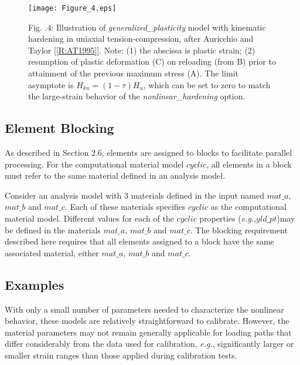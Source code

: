 \documentclass[11pt]{report}
\numberwithin{equation}{section}
\newcommand{\eg}{\emph{e.g.},\xspace}
\begin{document}
\begin{figure}[htb]
\begin{center}
\texttt{[image: Figure\_4.eps]} 

\caption*{\small Fig. \thesection.4: Illustration of \textit{generalized\_plasticity} 
model with kinematic hardening in 
uniaxial tension-compression, after Auricchio and Taylor [\ref{R:AT1995}]. Note: (1) the
abscissa is plastic strain; (2) resumption of plastic deformation (C) on 
reloading (from B) prior to attainment
of the previous maximum stress (A). The limit asymptote is $H_{ku}=(1-\tau)H_u$, which
can be set to zero to match the large-strain behavior of the
\textit{nonlinear\_hardening} option.
\normalsize}

\end{center}
\end{figure}
\subsection {Element Blocking}
As described in Section 2.6, elements are assigned to blocks
to facilitate parallel processing. For the computational material model
$cyclic$,
all elements in a block must refer to the same material defined
in an analysis model.

Consider an analysis model with 3 materials defined in the input
named $mat\_a$, $mat\_b$ and $mat\_c$. Each of these materials specifies
$cyclic$ as the computational material model. Different values for each of the
$cyclic$ properties  (\eg $yld\_pt$)may be defined in the materials
$mat\_a$, $mat\_b$ and $mat\_c$.  The blocking requirement
described here requires that all elements assigned to a block have the same
associated material, either $mat\_a$, $mat\_b$ and $mat\_c$.


\subsection {Examples}
With only a small number of parameters needed to characterize the nonlinear
behavior, these models are relatively straightforward to calibrate. However, the material parameters
may not remain generally applicable for loading paths that differ considerably from the data
used for calibration, \textit{e.g.}, significantly larger or smaller strain ranges
than those applied during calibration tests.
\end{document}
